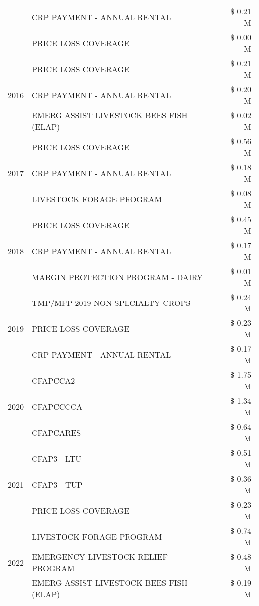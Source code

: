 \begin{tabular}{llr}
 & CRP PAYMENT - ANNUAL RENTAL & \$ 0.21 M \\
 & PRICE LOSS COVERAGE & \$ 0.00 M \\
\cline{1-3}
\multirow[t]{3}{*}{2016} & PRICE LOSS COVERAGE & \$ 0.21 M \\
 & CRP PAYMENT - ANNUAL RENTAL & \$ 0.20 M \\
 & EMERG ASSIST LIVESTOCK BEES FISH (ELAP) & \$ 0.02 M \\
\cline{1-3}
\multirow[t]{3}{*}{2017} & PRICE LOSS COVERAGE & \$ 0.56 M \\
 & CRP PAYMENT - ANNUAL RENTAL & \$ 0.18 M \\
 & LIVESTOCK FORAGE PROGRAM & \$ 0.08 M \\
\cline{1-3}
\multirow[t]{3}{*}{2018} & PRICE LOSS COVERAGE & \$ 0.45 M \\
 & CRP PAYMENT - ANNUAL RENTAL & \$ 0.17 M \\
 & MARGIN PROTECTION PROGRAM - DAIRY & \$ 0.01 M \\
\cline{1-3}
\multirow[t]{3}{*}{2019} & TMP/MFP 2019 NON SPECIALTY CROPS & \$ 0.24 M \\
 & PRICE LOSS COVERAGE & \$ 0.23 M \\
 & CRP PAYMENT - ANNUAL RENTAL & \$ 0.17 M \\
\cline{1-3}
\multirow[t]{3}{*}{2020} & CFAPCCA2 & \$ 1.75 M \\
 & CFAPCCCCA & \$ 1.34 M \\
 & CFAPCARES & \$ 0.64 M \\
\cline{1-3}
\multirow[t]{3}{*}{2021} & CFAP3 - LTU & \$ 0.51 M \\
 & CFAP3 - TUP & \$ 0.36 M \\
 & PRICE LOSS COVERAGE & \$ 0.23 M \\
\cline{1-3}
\multirow[t]{3}{*}{2022} & LIVESTOCK FORAGE PROGRAM & \$ 0.74 M \\
 & EMERGENCY LIVESTOCK RELIEF PROGRAM & \$ 0.48 M \\
 & EMERG ASSIST LIVESTOCK BEES FISH (ELAP) & \$ 0.19 M \\
\cline{1-3}
\bottomrule
\end{tabular}
